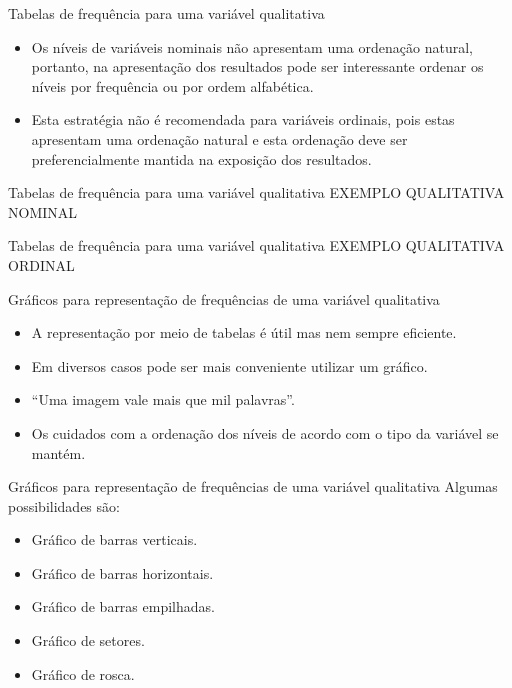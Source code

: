 \documentclass[
  ignorenonframetext,
  serif,
  professionalfont,
  usenames,
  dvipsnames,
  aspectratio = 169]{beamer}
\providecommand{\tightlist}{%
  \setlength{\itemsep}{0pt}\setlength{\parskip}{0pt}}
\renewcommand{\tightlist}{%
  \setlength{\itemsep}{0\baselineskip}
  \setlength{\parskip}{0.25\baselineskip}
}
\begin{document}
\begin{frame}{Tabelas de frequência para uma variável qualitativa}
\protect\hypertarget{tabelas-de-frequuxeancia-para-uma-variuxe1vel-qualitativa-2}{}
\begin{itemize}
\item
  Os níveis de variáveis nominais não apresentam uma ordenação natural,
  portanto, na apresentação dos resultados pode ser interessante ordenar
  os níveis por frequência ou por ordem alfabética.
\item
  Esta estratégia não é recomendada para variáveis ordinais, pois estas
  apresentam uma ordenação natural e esta ordenação deve ser
  preferencialmente mantida na exposição dos resultados.
\end{itemize}
\end{frame}

\begin{frame}{Tabelas de frequência para uma variável qualitativa}
\protect\hypertarget{tabelas-de-frequuxeancia-para-uma-variuxe1vel-qualitativa-3}{}
EXEMPLO QUALITATIVA NOMINAL
\end{frame}

\begin{frame}{Tabelas de frequência para uma variável qualitativa}
\protect\hypertarget{tabelas-de-frequuxeancia-para-uma-variuxe1vel-qualitativa-4}{}
EXEMPLO QUALITATIVA ORDINAL
\end{frame}

\begin{frame}{Gráficos para representação de frequências de uma variável
qualitativa}
\protect\hypertarget{gruxe1ficos-para-representauxe7uxe3o-de-frequuxeancias-de-uma-variuxe1vel-qualitativa}{}
\begin{itemize}
\item
  A representação por meio de tabelas é útil mas nem sempre eficiente.
\item
  Em diversos casos pode ser mais conveniente utilizar um gráfico.
\item
  ``Uma imagem vale mais que mil palavras''.
\item
  Os cuidados com a ordenação dos níveis de acordo com o tipo da
  variável se mantém.
\end{itemize}
\end{frame}

\begin{frame}{Gráficos para representação de frequências de uma variável
qualitativa}
\protect\hypertarget{gruxe1ficos-para-representauxe7uxe3o-de-frequuxeancias-de-uma-variuxe1vel-qualitativa-1}{}
Algumas possibilidades são:

\begin{itemize}
\tightlist
\item
  Gráfico de barras verticais.
\item
  Gráfico de barras horizontais.
\item
  Gráfico de barras empilhadas.
\item
  Gráfico de setores.
\item
  Gráfico de rosca.
\end{itemize}
\end{frame}
\end{document}

